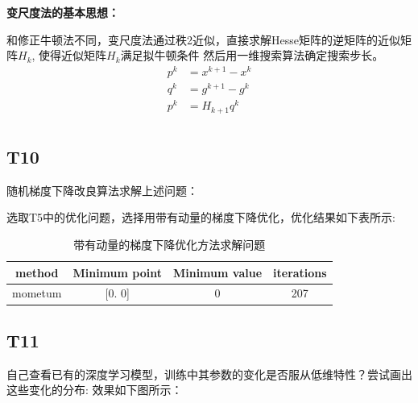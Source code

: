 \documentclass[a4paper]{article}
\begin{document}
    \textbf{变尺度法的基本思想：}

    和修正牛顿法不同，变尺度法通过秩2近似，直接求解Hesse矩阵的逆矩阵的近似矩阵$H_k$, 使得近似矩阵$H_k$满足拟牛顿条件
    然后用一维搜索算法确定搜索步长。
    \begin{align*}
        p^k &= x^{k+1}- x^{k} \\
        q^k &= g^{k+1}- g^{k} \\
        p^k &= H_{k+1}q^k \\ 
    \end{align*}

    \subsection*{T10}
    随机梯度下降改良算法求解上述问题：
    
    选取T5中的优化问题，选择用带有动量的梯度下降优化，优化结果如下表所示:
    \begin{table}[h!]
        \centering
        \begin{tabular}{cccc}
            \toprule
            method  &  Minimum point & Minimum value & iterations  \\
            \midrule
            mometum & [0.   0] & 0 & 207\\
            \bottomrule
        \end{tabular}
        \caption{带有动量的梯度下降优化方法求解问题}
        \end{table}



    \subsection*{T11}
    自己查看已有的深度学习模型，训练中其参数的变化是否服从低维特性？尝试画出这些变化的分布:
    效果如下图所示：\\
\end{document}
